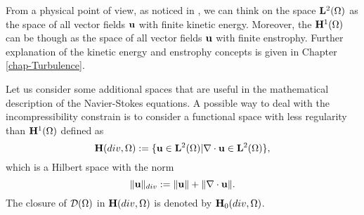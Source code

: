 From a physical point of view, as noticed in \cite{Foias}, we can think on the space ${\bf L}^2(\Omega)$ as the space of all vector fields ${\bf u}$ with finite kinetic energy. Moreover, the ${\bf H}^1(\Omega)$ can be though as the space of all vector fields ${\bf u}$ with finite enstrophy. Further explanation of the kinetic energy and enstrophy concepts is given in Chapter \ref{chap-Turbulence}.

Let us consider some additional spaces that are useful in the mathematical description of the Navier-Stokes equations. A possible way to deal with the incompressibility constrain  is to consider a functional space with less regularity than ${\bf H}^1(\Omega)$ defined as
$${\bf H}(div,\Omega):=\{{\bf u}\in{\bf L}^2(\Omega)|\nabla\cdot{\bf u}\in{\bf L}^2(\Omega)\},$$
which is a Hilbert space with the norm
$$\|{\bf u}\|_{div}:=\|{\bf u}\|+\|\nabla\cdot{\bf u}\|.$$
The closure of $\mathcal{D}(\Omega)$ in ${\bf H}(div,\Omega)$ is denoted by ${\bf H}_0(div,\Omega)$.